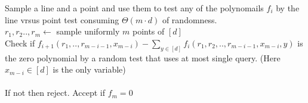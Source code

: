 \documentclass{article}
\begin{document}
\begin{algorithm}[H]
  Sample a line and a point and use them to test any of the polynomails $f_{i}$ by the line vrsus point test consuming $\Theta\left( m\cdot d \right)$ of randomness. \\  
    $r_{1}, r_{2} .., r_{m} \leftarrow$ sample uniformly  $m$ points of $[d]$ \\
     {
      Check if $f_{i+1}\left( r_{1} , .., r_{m-i-1}, x_{m-i} \right) - \sum_{y \in [d]}{f_{i} \left( r_{1}, r_{2}, .., r_{m-i-1},x_{m-i}, y \right)} $ is the zero polynomial by a random test that uses at most single query. (Here $x_{m-i} \in [d]$ is the only variable)  \\
      \ \\
      If not then reject.  
    }
    Accept if $f_{m} = 0 $  
\end{algorithm}
\end{document}
